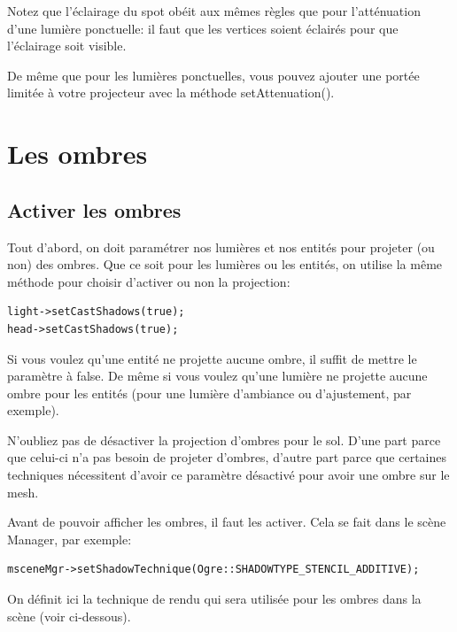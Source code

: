 \documentclass[10pt,a4paper]{report}
\begin{document}
Notez que l'\'eclairage du spot ob\'eit aux m\^emes r\`egles que pour l'att\'enuation d'une lumi\`ere ponctuelle: il faut que les vertices soient \'eclair\'es pour que l'\'eclairage soit visible.


De m\^eme que pour les lumi\`eres ponctuelles, vous pouvez ajouter une port\'ee limit\'ee \`{a} votre projecteur avec la m\'ethode setAttenuation().






\section{Les ombres}


\subsection{Activer les ombres}

Tout d'abord, on doit param\'etrer nos lumi\`eres et nos entit\'es pour projeter (ou non) des ombres.
Que ce soit pour les lumi\`eres ou les entit\'es, on utilise la m\^eme m\'ethode pour choisir d'activer ou non la projection:

\begin{lstlisting}
light->setCastShadows(true);
head->setCastShadows(true);
\end{lstlisting}


Si vous voulez qu'une entit\'e ne projette aucune ombre, il suffit de mettre le param\`etre \`{a} false. De m\^eme si vous voulez qu'une lumi\`ere ne projette aucune ombre pour les entit\'es (pour une lumi\`ere d'ambiance ou d'ajustement, par exemple).

N'oubliez pas de d\'esactiver la projection d'ombres pour le sol. D'une part parce que celui-ci n'a pas besoin de projeter d'ombres, d'autre part parce que certaines techniques n\'ecessitent d'avoir ce param\`etre d\'esactiv\'e pour avoir une ombre sur le mesh.

Avant de pouvoir afficher les ombres, il faut les activer. Cela se fait dans le sc\`ene Manager, par exemple:

\begin{lstlisting}
msceneMgr->setShadowTechnique(Ogre::SHADOWTYPE_STENCIL_ADDITIVE);
\end{lstlisting}



On d\'efinit ici la technique de rendu qui sera utilis\'ee pour les ombres dans la sc\`ene (voir ci-dessous).
\end{document}
